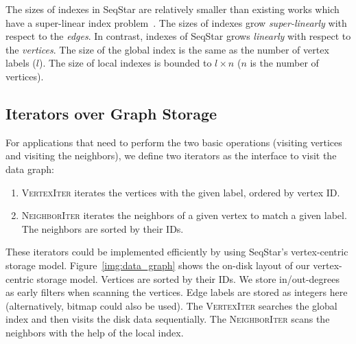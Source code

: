 The sizes of indexes in SeqStar are relatively smaller than existing works which have a super-linear index problem~\cite{DBLP:journals/pvldb/SunWWSL12}. The sizes of indexes grow \emph{super-linearly} with respect to the \emph{edges}.
In contrast, indexes of SeqStar grows \emph{linearly} with respect to the \emph{vertices}.
The size of the global index is the same as the number of vertex labels ($l$). The size of local indexes is bounded to $l \times n$ ($n$ is the number of vertices).
\subsection{Iterators over Graph Storage}\label{sec:storage_iterators}
For applications that need to perform the two basic operations (visiting vertices and visiting the neighbors),
we define two iterators as the interface to visit the data graph:
\begin{enumerate}[noitemsep]
\item \textsc{VertexIter} iterates the vertices with the given label, ordered by vertex ID\@.
\item \textsc{NeighborIter} iterates the neighbors of a given vertex to match a given label. The neighbors are sorted by their IDs.

\end{enumerate}

These iterators could be implemented efficiently by using SeqStar's vertex-centric storage model.
Figure~\ref{img:data_graph} shows the on-disk layout of our vertex-centric storage model.
Vertices are sorted by their IDs. We store in/out-degrees as early filters when scanning the vertices.
Edge labels are stored as integers here (alternatively, bitmap could also be used).
The \textsc{VertexIter} searches the global index and then visits the disk data sequentially.
The \textsc{NeighborIter} scans the neighbors with the help of the local index.

